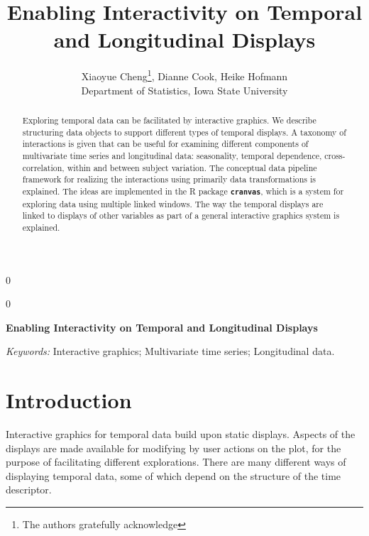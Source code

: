 \documentclass[12pt]{article}
\newcommand{\blind}{0}
\begin{document}
\def\spacingset#1{\renewcommand{\baselinestretch}%
{#1}\small\normalsize} \spacingset{1}


\blind
{
  \title{\bf Enabling Interactivity on Temporal and Longitudinal Displays}
  \author{Xiaoyue Cheng\thanks{
    The authors gratefully acknowledge},\hspace{.2cm}
    Dianne Cook, Heike Hofmann \\
    Department of Statistics, Iowa State University
    }
  \maketitle
} \fi

\blind
{
  \bigskip
  \bigskip
  \bigskip
  \begin{center}
    {\LARGE\bf Enabling Interactivity on Temporal and Longitudinal Displays}
\end{center}
  \medskip
} \fi

\bigskip
\begin{abstract}
Exploring temporal data can be facilitated by interactive graphics.
We describe structuring data objects to support different types of
temporal displays. A taxonomy of interactions is given that can be
useful for examining different components of multivariate time
series and longitudinal data: seasonality, temporal dependence,
cross-correlation, within and between subject variation. The
conceptual data pipeline framework for realizing the interactions
using primarily data transformations is explained. The ideas are
implemented in the R package \texttt{\textbf{cranvas}}, which is
a system for exploring data using multiple linked windows. The way
the temporal displays are linked to displays of other variables as
part of a general interactive graphics system is explained.
\end{abstract}

\noindent%
{\it Keywords:}  Interactive graphics; Multivariate time series;
Longitudinal data.

\spacingset{1.45}

\section{Introduction}

Interactive graphics for temporal data build upon static displays. Aspects of the displays are made available for modifying by user actions on the plot, for the purpose of facilitating different explorations. There are many different ways of displaying temporal data, some of which depend on the structure of the time descriptor. 
\end{document}
